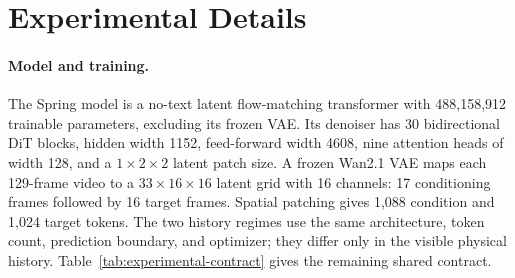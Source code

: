 \section{Experimental Details}
\label{app:experimental-details}

\paragraph{Model and training.}
The Spring model is a no-text latent flow-matching transformer with
488,158,912 trainable parameters, excluding its frozen VAE. Its denoiser has 30
bidirectional DiT blocks, hidden width 1152, feed-forward width 4608, nine
attention heads of width 128, and a $1\times2\times2$ latent patch size. A frozen
Wan2.1 VAE maps each 129-frame video to a $33\times16\times16$ latent grid with
16 channels: 17 conditioning frames followed by 16 target frames. Spatial
patching gives 1,088 condition and 1,024 target tokens.
The two history regimes use the same architecture, token count, prediction
boundary, and optimizer; they differ only in the visible physical history.
Table~\ref{tab:experimental-contract} gives the remaining shared contract.

